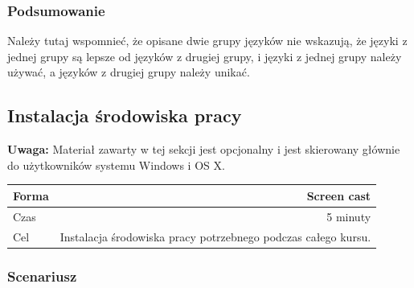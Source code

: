 \documentclass{mwart}
\begin{document}
\subsubsection{Podsumowanie}
Należy tutaj wspomnieć, że opisane dwie grupy języków nie wskazują, że języki z jednej
grupy są lepsze od języków z drugiej grupy, i języki z jednej grupy należy używać, a
języków z drugiej grupy należy unikać.

\subsection{Instalacja środowiska pracy}

\textbf{Uwaga:} Materiał zawarty w tej sekcji jest opcjonalny i jest skierowany głównie do użytkowników systemu
Windows i OS X.
\begin{center}
  \begin{tabular}{lr}
    \toprule
    Forma & Screen cast \\
    \midrule
    Czas & 5 minuty \\
    Cel & Instalacja środowiska pracy potrzebnego podczas całego kursu. \\
    \bottomrule
  \end{tabular}
\end{center}

\subsubsection{Scenariusz}
\end{document}
